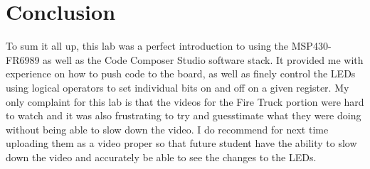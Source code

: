 \documentclass{article}
\begin{document}
\section{Conclusion}
To sum it all up, this lab was a perfect introduction to using the MSP430-FR6989 as well as the Code Composer Studio software stack. It provided me with experience on how to push code to the board, as well as finely control the LEDs using logical operators to set individual bits on and off on a given register. My only complaint for this lab is that the videos for the Fire Truck portion were hard to watch and it was also frustrating to try and guesstimate what they were doing without being able to slow down the video. I do recommend for next time uploading them as a video proper so that future student have the ability to slow down the video and accurately be able to see the changes to the LEDs.
\end{document}
